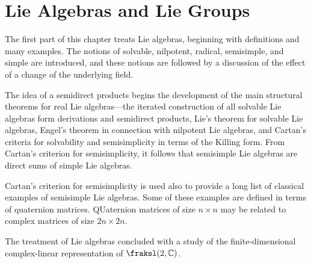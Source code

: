 \section{Lie Algebras and Lie Groups}
The first part of this chapter treats Lie algebras, beginning with
definitions and many examples. The notions of solvable, nilpotent, radical,
semisimple, and simple are introduced, and these notions are followed by a
discussion of the effect of a change of the underlying field.

The idea of a semidirect products begins the development of the main
structural theorems for real Lie algebras---the iterated construction of
all solvable Lie algebras form derivations and semidirect products, Lie's
theorem for solvable Lie algebras, Engel's theorem in connection with
nilpotent Lie algebras, and Cartan's criteria for solvability and
semisimplicity in terms of the Killing form. From Cartan's criterion for
semisimplicity, it follows that semisimple Lie algebras are direct sums of
simple Lie algebras.

Cartan's criterion for semisimplicity is used also to provide a long list
of classical examples of semisimple Lie algebras. Some of these examples
are defined in terms of quaternion matrices. QUaternion matrices of size
$n\times n$ may be related to complex matrices of size $2n\times 2n$.

The treatment of Lie algebras concluded with a study of the
finite-dimensional complex-linear representation of $\fraksl(2,\bbC)$.


